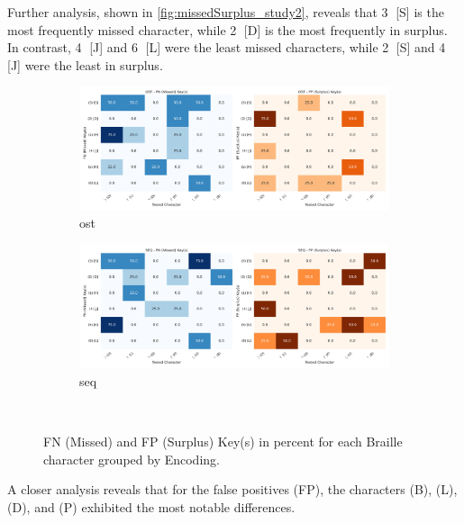 Further analysis, shown in \autoref{fig:missedSurplus_study2}, reveals that \textcircled{3} [S] is the most frequently missed character, while \textcircled{2} [D] is the most frequently in surplus. In contrast, \textcircled{4} [J] and \textcircled{6} [L] were the least missed characters, while \textcircled{2} [S] and \textcircled{4} [J] were the least in surplus.

\begin{figure}[h!]
    \centering
    \begin{subfigure}[b]{0.45\textwidth}
        \centering
        \includegraphics[width=\textwidth]{src/pictures/Study2Data_Experiment/missed_surplus_test_percentages_study2_ost.pdf}
        \caption{\gls{ost}}
    \end{subfigure}
    \begin{subfigure}[b]{0.45\textwidth}
        \centering
        \includegraphics[width=\textwidth]{src/pictures/Study2Data_Experiment/missed_surplus_test_percentages_study2_seq.pdf}
        \caption{\gls{seq}}
    \end{subfigure}\\
    \caption{FN (Missed) and FP (Surplus) Key(s) in percent for each Braille character grouped by Encoding.}
    \label{fig:missed_surplus_percentages_study2}
\end{figure}

A closer analysis reveals that for the false positives (FP), the characters (B), (L), (D), and (P) exhibited the most notable differences.

